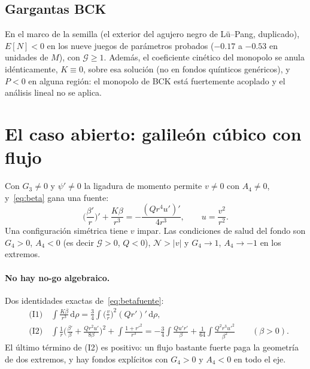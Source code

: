 \documentclass[11pt,a4paper]{article}
\theoremstyle{remark}
\newcommand{\G}{\mathcal G}
\newcommand{\Ncal}{\mathcal N}
\newcommand{\dd}{\mathrm d}
\begin{document}
\subsection{Gargantas BCK}\label{sec:BCK}

En el marco de la semilla (el exterior del agujero negro de Lü--Pang, duplicado), $E[N]<0$ en los nueve juegos de parámetros probados ($-0.17$ a $-0.53$ en unidades de $M$), con $\G\ge1$. Además, el coeficiente cinético del monopolo se anula idénticamente, $K\equiv0$, sobre esa solución (no en fondos quínticos genéricos), y $P<0$ en alguna región: el monopolo de BCK está fuertemente acoplado y el análisis lineal no se aplica.

\section{El caso abierto: galileón cúbico con flujo}\label{sec:cubico}

Con $G_3\neq0$ y $\psi'\neq0$ la ligadura de momento permite $v\neq0$ con $A_4\neq0$, y~\eqref{eq:beta} gana una fuente:
\begin{equation}
\Big(\frac{\beta'}r\Big)'+\frac{K\beta}{r^3}=-\frac{(Qr^4u')'}{4r^3},\qquad u=\frac{v^2}{r^2}.
\label{eq:betafuente}
\end{equation}
Una configuración simétrica tiene $v$ impar. Las condiciones de salud del fondo son $G_4>0$, $A_4<0$ (es decir $\G>0$, $Q<0$), $\Ncal>|v|$ y $G_4\to1$, $A_4\to-1$ en los extremos.

\paragraph{No hay no-go algebraico.} Dos identidades exactas de~\eqref{eq:betafuente}:
\begin{align}
&\text{(I1)}\quad \int\frac{K\beta}{r^3}\,\dd\rho=\frac34\int\Big(\frac vr\Big)^2(Qr')'\,\dd\rho,\\
&\text{(I2)}\quad \int\frac1r\Big(\frac{\beta'}\beta+\frac{Qr^2u'}{8\beta}\Big)^2+\int\frac{1+r'^2}{r^3}=-\frac34\int\frac{Qu'r'}\beta+\frac1{64}\int\frac{Q^2r^3u'^2}{\beta^2}\qquad(\beta>0).
\end{align}
El último término de (I2) es positivo: un flujo bastante fuerte paga la geometría de dos extremos, y hay fondos explícitos con $G_4>0$ y $A_4<0$ en todo el eje.
\end{document}

